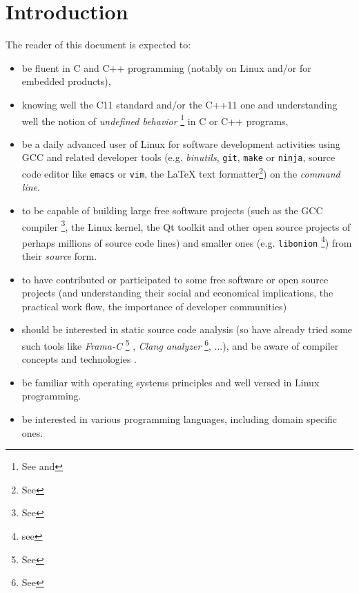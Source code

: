 \section{Introduction}

The reader of this document is expected to:
\begin{itemize}

  \item be fluent in C \cite{Kernighan:1988:CPL} and C++
    \cite{Stroustrup:2014:CplusPlus} programming (notably on Linux
    and/or for embedded products),

  \item knowing well the C11 standard
    \cite{C11:std,Memarian:2016:PLDI} and/or the C++11 one
    \cite{CplusPlus11:std} and understanding well the notion of
    \emph{undefined behavior} \footnote{See
      and } in C or C++
    programs,

  \item be a daily advanced user of Linux for software development
    activities using GCC and related developer tools
    (e.g. \textit{binutils}, \texttt{git}, \texttt{make} or
    \texttt{ninja}, source code editor like \texttt{emacs} or
    \texttt{vim}, the {\LaTeX} text formatter\footnote{See
      }) on the \emph{command
      line}.


\item to be capable of building large free software projects (such as
  the GCC compiler \cite{gcc-internals} \footnote{See
    }, the Linux kernel, the Qt toolkit and
  other open source projects of perhaps millions of source code lines)
  and smaller ones (e.g. \texttt{libonion} \footnote{see
    }) from their \emph{source}
  form.

\item to have contributed or participated to some free software or
  open source projects (and understanding their social and economical
  \cite{Weber:2004:SuccessOpenSource} implications, the practical work
  flow, the importance of developer communities)
  
\item should be interested in static source code analysis (so have
  already tried some such tools like \emph{Frama-C} \footnote{See
    } \cite{Cuoq:2012:Frama-C}, \emph{Clang
    analyzer} \footnote{See },
  ...), and be aware of compiler concepts and technologies \cite{Aho:2006:DragonBook}.

\item be familiar with operating systems principles
  \cite{Tanenbaum:92:OS,ArpaciDusseau14-Book,OSTEP-web} and well
  versed in Linux programming.

  \item be interested in various programming languages, including
    domain specific ones.

\end{itemize}

